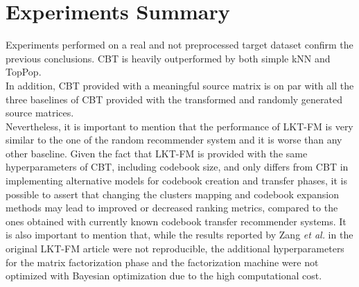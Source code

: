 \clearpage



\section{Experiments Summary}

Experiments performed on a real and not preprocessed target dataset confirm the previous conclusions. CBT is heavily outperformed by both simple kNN and TopPop.\\
In addition, CBT provided with a meaningful source matrix is on par with all the three baselines of CBT provided with the transformed and randomly generated source matrices.\\
Nevertheless, it is important to mention that the performance of LKT-FM is very similar to the one of the random recommender system and it is worse than any other baseline. Given the fact that LKT-FM is provided with the same hyperparameters of CBT, including codebook size, and only differs from CBT in implementing alternative models for codebook creation and transfer phases, it is possible to assert that changing the clusters mapping and codebook expansion methods may lead to improved or decreased ranking metrics, compared to the ones obtained with currently known codebook transfer recommender systems. It is also important to mention that, while the results reported by Zang \textit{et al.} in the original LKT-FM article \cite{10.1007/978-3-319-71246-8_39} were not reproducible, the additional hyperparameters for the matrix factorization phase and the factorization machine were not optimized with Bayesian optimization due to the high computational cost.